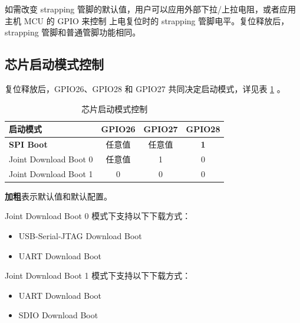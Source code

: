 \documentclass[main\_\_CN.tex]{subfiles}
\begin{document}
如需改变 strapping 管脚的默认值，用户可以应用外部下拉/上拉电阻，或者应用主机 MCU 的 GPIO 来控制 \chipname{} 上电复位时的 strapping 管脚电平。复位释放后，strapping 管脚和普通管脚功能相同。

\subsection{芯片启动模式控制}
\label{sec:bootModeControl}

复位释放后，GPIO26、GPIO28 和 GPIO27 共同决定启动模式，详见表 \ref{tab:bootctrl-boot-mode-control} \textit{}。

\begin{table}[H]
    \centering
    \caption{芯片启动模式控制}
    \label{tab:bootctrl-boot-mode-control}

    \begin{threeparttable}
    \begin{tabular}{ | l | c | c | c | }
    \hline
        \rowcolor{lightgray}
        \textbf{启动模式} & \textbf{GPIO26} & \textbf{GPIO27} & \textbf{GPIO28} \\\hline
        \textbf{SPI Boot}\tnote{1} & 任意值 & 任意值 & \textbf{1}\tnote{1} \\\hline
        Joint Download Boot 0\tnote{2} & 任意值 & 1 & 0 \\\hline
        Joint Download Boot 1\tnote{3} & 0 & 0 & 0 \\\hline
        \end{tabular}

        \begin{tablenotes}
            \item[1] \textbf{加粗}表示默认值和默认配置。
            \item[2] Joint Download Boot 0 模式下支持以下下载方式：
                \begin{itemize}
                    \item USB-Serial-JTAG Download Boot
                    \item UART Download Boot
                \end{itemize}
            \item[3] Joint Download Boot 1 模式下支持以下下载方式：
                \begin{itemize}
                    \item UART Download Boot
                    \item SDIO Download Boot
                \end{itemize}
        \end{tablenotes}
     \end{threeparttable}
\end{table}
\end{document}
